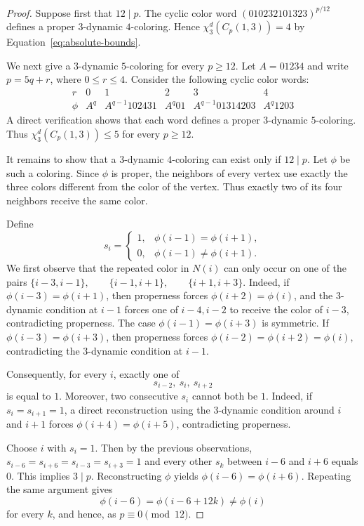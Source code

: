 \documentclass[a4paper,11pt]{article}
\theoremstyle{case}
\numberwithin{subcase}{case}
\begin{document}
\begin{proof}
Suppose first that $12\mid p$. The cyclic color word
$
(010232101323)^{p/12}
$
defines a proper $3$-dynamic $4$-coloring. Hence
$\chi_3^d(C_p(1,3))=4$ by
Equation~\ref{eq:absolute-bounds}.

We next give a $3$-dynamic $5$-coloring for every $p\ge12$.
Let $A=01234$ and write $p=5q+r$, where $0\le r\le4$.
Consider the following cyclic color words:
\[
\begin{array}{c|ccccc}
r&0&1&2&3&4\\ \hline
\phi&
A^q&
A^{q-1}102431&
A^q01&
A^{q-1}01314203&
A^q1203
\end{array}
\]
A direct verification shows that each word defines a proper
$3$-dynamic $5$-coloring. Thus
$
\chi_3^d(C_p(1,3))\le5
$
for every $p\ge12$.

It remains to show that a $3$-dynamic $4$-coloring can exist only if
$12\mid p$. Let $\phi$ be such a coloring. Since $\phi$ is proper,
the neighbors of every vertex use exactly the three colors different
from the color of the vertex. Thus exactly two of its four neighbors
receive the same color.

Define
\[
s_i=
\begin{cases}
1,&\phi(i-1)=\phi(i+1),\\
0,&\phi(i-1)\neq\phi(i+1).
\end{cases}
\]
We first observe that the repeated color in $N(i)$ can only occur on
one of the pairs
$
\{i-3,i-1\},\qquad
\{i-1,i+1\},\qquad
\{i+1,i+3\}.
$
Indeed, if $\phi(i-3)=\phi(i+1)$, then properness forces
$\phi(i+2)=\phi(i)$, and the $3$-dynamic condition at $i-1$ forces
one of $i-4,i-2$ to receive the color of $i-3$, contradicting
properness. The case $\phi(i-1)=\phi(i+3)$ is symmetric. If
$\phi(i-3)=\phi(i+3)$, then properness forces
$
\phi(i-2)=\phi(i+2)=\phi(i),
$
contradicting the $3$-dynamic condition at $i-1$.

Consequently, for every $i$, exactly one of
\[
s_{i-2},\ s_i,\ s_{i+2}
\]
is equal to $1$. Moreover, two consecutive $s_i$ cannot both be $1$.
Indeed, if $s_i=s_{i+1}=1$, a direct reconstruction using the
$3$-dynamic condition around $i$ and $i+1$ forces
$\phi(i+4)=\phi(i+5)$, contradicting properness.

Choose $i$ with $s_i=1$. Then by the previous
observations, $s_{i-6}=s_{i+6}=s_{i-3}=s_{i+3}=1$ and every other $s_k$ between $i-6$ and $i+6$ equals 0.
This implies $3\mid p$.
Reconstructing $\phi$ yields
$\phi(i-6)=\phi(i+6)$.
Repeating the same argument gives
\[
\phi(i-6)=\phi(i-6+12k) \neq \phi(i)
\]
for every $k$, and hence, as $p\equiv0\pmod {12}$.
\end{proof}
\end{document}
